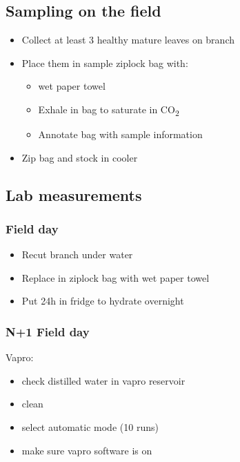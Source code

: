 \documentclass[
  12pt,
  american,
  a4paper,
  extrafontsizes,onecolumn,openright
  ]{memoir}
\providecommand{\tightlist}{%
  \setlength{\itemsep}{0pt}\setlength{\parskip}{0pt}}
\begin{document}
\hypertarget{sampling-on-the-field}{%
\subsection{Sampling on the field}\label{sampling-on-the-field}}

\begin{itemize}
\tightlist
\item
  Collect at least 3 healthy mature leaves on branch
\item
  Place them in sample ziplock bag with:

  \begin{itemize}
  \tightlist
  \item
    wet paper towel
  \item
    Exhale in bag to saturate in CO\textsubscript{2}
  \item
    Annotate bag with sample information
  \end{itemize}
\item
  Zip bag and stock in cooler
\end{itemize}

\hypertarget{lab-measurements}{%
\subsection{Lab measurements}\label{lab-measurements}}

\hypertarget{field-day}{%
\subsubsection{Field day}\label{field-day}}

\begin{itemize}
\tightlist
\item
  Recut branch under water
\item
  Replace in ziplock bag with wet paper towel
\item
  Put 24h in fridge to hydrate overnight
\end{itemize}

\hypertarget{n1-field-day}{%
\subsubsection{N+1 Field day}\label{n1-field-day}}

Vapro:

\begin{itemize}
\tightlist
\item
  check distilled water in vapro reservoir
\item
  clean
\item
  select automatic mode (10 runs)
\item
  make sure vapro software is on
\end{itemize}
\end{document}
